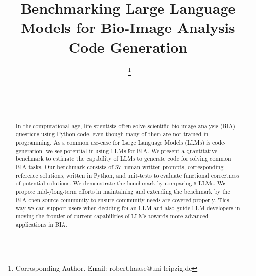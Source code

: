 \documentclass{ecai}
\begin{document}

\begin{frontmatter}




\title{Benchmarking Large Language Models for Bio-Image Analysis Code Generation}


\author[A,B]{~\thanks{Corresponding Author. Email: robert.haase@uni-leipzig.de}}
\author[C]{~}
\author[D,B]{~} 

\address[A]{Data Science Center, Leipzig University, Humboldtstra{\ss}e 25, 04105 Leipzig, Germany}
\address[B]{Center for Scalable Data Analytics and Artificial Intelligence (ScaDS.AI) Dresden / Leipzig}
\address[C]{Data Science Centre, European Molecular Biology Laboratory, Meyerhofstra{\ss}e 1, 69117 Heidelberg, Germany}
\address[D]{Max Planck Institute for Human Cognitive and Brain Sciences, Stephanstra{\ss}e 1A, 04103, Leipzig, Germany}


\begin{abstract}
In the computational age, life-scientists often solve scientific bio-image analysis (BIA) questions using Python code, even though many of them are not trained in programming. As a common use-case for Large Language Models (LLMs) is code-generation, we see potential in using LLMs for BIA. We present a quantitative benchmark to estimate the capability of LLMs to generate code for solving common BIA tasks. Our benchmark consists of 57 human-written prompts, corresponding reference solutions, written in Python, and unit-tests to evaluate functional correctness of potential solutions. We demonstrate the benchmark by comparing 6 LLMs. We propose mid-/long-term efforts in maintaining and extending the benchmark by the BIA open-source community to ensure community needs are covered properly. This way we can support users when deciding for an LLM and also guide LLM developers in moving the frontier of current capabilities of LLMs towards more advanced applications in BIA. 
\end{abstract}

\end{frontmatter}
\end{document}
